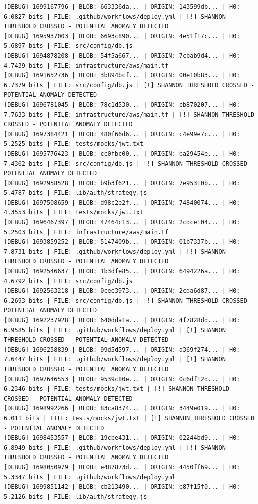 \documentclass[12pt, a4paper, oneside]{report}
\begin{document}
\begin{lstlisting}[basicstyle=\tiny\ttfamily]
[DEBUG] 1699167796 | BLOB: 663336da... | ORIGIN: 143599db... | H0: 6.0827 bits | FILE: .github/workflows/deploy.yml | [!] SHANNON THRESHOLD CROSSED - POTENTIAL ANOMALY DETECTED
[DEBUG] 1695937003 | BLOB: 6693c890... | ORIGIN: 4e51f17c... | H0: 5.6897 bits | FILE: src/config/db.js
[DEBUG] 1694878208 | BLOB: 54f5a667... | ORIGIN: 7cbab9d4... | H0: 4.7439 bits | FILE: infrastructure/aws/main.tf
[DEBUG] 1691652736 | BLOB: 3b894bcf... | ORIGIN: 00e10b83... | H0: 6.7379 bits | FILE: src/config/db.js | [!] SHANNON THRESHOLD CROSSED - POTENTIAL ANOMALY DETECTED
[DEBUG] 1696781045 | BLOB: 78c1d530... | ORIGIN: cb870207... | H0: 7.7633 bits | FILE: infrastructure/aws/main.tf | [!] SHANNON THRESHOLD CROSSED - POTENTIAL ANOMALY DETECTED
[DEBUG] 1697384421 | BLOB: 480f66d6... | ORIGIN: c4e99e7c... | H0: 5.2525 bits | FILE: tests/mocks/jwt.txt
[DEBUG] 1695776423 | BLOB: cc0fbc00... | ORIGIN: ba29454e... | H0: 7.4362 bits | FILE: src/config/db.js | [!] SHANNON THRESHOLD CROSSED - POTENTIAL ANOMALY DETECTED
[DEBUG] 1692958528 | BLOB: b9b3f621... | ORIGIN: 7e95310b... | H0: 5.4787 bits | FILE: lib/auth/strategy.js
[DEBUG] 1697508659 | BLOB: d98c2e2f... | ORIGIN: 74840074... | H0: 4.3553 bits | FILE: tests/mocks/jwt.txt
[DEBUG] 1696467397 | BLOB: 47464c13... | ORIGIN: 2cdce104... | H0: 5.2503 bits | FILE: infrastructure/aws/main.tf
[DEBUG] 1693859252 | BLOB: 5147409b... | ORIGIN: 01b7337b... | H0: 7.8731 bits | FILE: .github/workflows/deploy.yml | [!] SHANNON THRESHOLD CROSSED - POTENTIAL ANOMALY DETECTED
[DEBUG] 1692546637 | BLOB: 1b3dfe85... | ORIGIN: 6494226a... | H0: 4.6792 bits | FILE: src/config/db.js
[DEBUG] 1692563218 | BLOB: 0cee3973... | ORIGIN: 2cda6d87... | H0: 6.2693 bits | FILE: src/config/db.js | [!] SHANNON THRESHOLD CROSSED - POTENTIAL ANOMALY DETECTED
[DEBUG] 1692237928 | BLOB: 640dda1a... | ORIGIN: 4f7828dd... | H0: 6.9585 bits | FILE: .github/workflows/deploy.yml | [!] SHANNON THRESHOLD CROSSED - POTENTIAL ANOMALY DETECTED
[DEBUG] 1696258839 | BLOB: 99d5d597... | ORIGIN: a369f274... | H0: 7.6447 bits | FILE: .github/workflows/deploy.yml | [!] SHANNON THRESHOLD CROSSED - POTENTIAL ANOMALY DETECTED
[DEBUG] 1697646553 | BLOB: 9539c80e... | ORIGIN: 0c6df12d... | H0: 6.2346 bits | FILE: tests/mocks/jwt.txt | [!] SHANNON THRESHOLD CROSSED - POTENTIAL ANOMALY DETECTED
[DEBUG] 1698992266 | BLOB: 83ca8374... | ORIGIN: 3449e019... | H0: 6.011 bits | FILE: tests/mocks/jwt.txt | [!] SHANNON THRESHOLD CROSSED - POTENTIAL ANOMALY DETECTED
[DEBUG] 1698453557 | BLOB: 19cbe431... | ORIGIN: 02244bd9... | H0: 6.8949 bits | FILE: .github/workflows/deploy.yml | [!] SHANNON THRESHOLD CROSSED - POTENTIAL ANOMALY DETECTED
[DEBUG] 1698050979 | BLOB: e487873d... | ORIGIN: 4450ff69... | H0: 5.3347 bits | FILE: .github/workflows/deploy.yml
[DEBUG] 1699851142 | BLOB: cb213490... | ORIGIN: b87f15f0... | H0: 5.2126 bits | FILE: lib/auth/strategy.js
\end{lstlisting}
\end{document}
